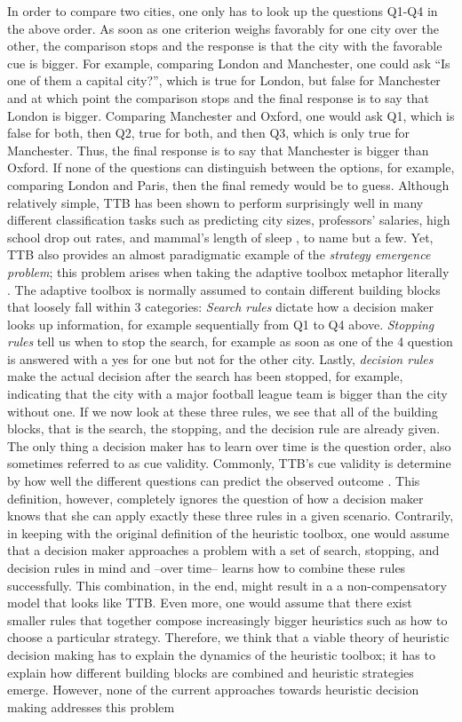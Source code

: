 \documentclass[a4paper,man, natbib]{apa6}
\begin{document}
In order to compare two cities, one only has to look up the questions Q1-Q4 in the above order. As soon as one criterion weighs favorably for one city over the other, the comparison stops and the response is that the city with the favorable cue is bigger. For example, comparing London and Manchester, one could ask ``Is one of them a capital city?'', which is true for London, but false for Manchester and at which point the comparison stops and the final response is to say that London is bigger. Comparing Manchester and Oxford, one would ask Q1, which is false for both, then Q2, true for both, and then Q3, which is only true for Manchester. Thus, the final response is to say that Manchester is bigger than Oxford. If none of the questions can distinguish between the options, for example, comparing London and Paris, then the final remedy would be to guess. Although relatively simple, TTB has been shown to perform surprisingly well in many different classification tasks such as predicting city sizes, professors' salaries, high school drop out rates, and mammal's length of sleep \citep{gigerenzer1999simple}, to name but a few. Yet, TTB also provides an almost paradigmatic example of the \emph{strategy emergence problem}; this problem arises when taking the adaptive toolbox metaphor literally \citep{gigerenzer2011heuristic}. The adaptive toolbox is normally assumed to contain different building blocks that loosely fall within 3 categories: \emph{Search rules} dictate how a decision maker looks up information, for example sequentially from Q1 to Q4 above. \emph{Stopping rules} tell us when to stop the search, for example as soon as one of the 4 question is answered with a yes for one but not for the other city. Lastly, \emph{decision rules} make the actual decision after the search has been stopped, for example, indicating that the city with a major football league team is bigger than the city without one. If we now look at these three rules, we see that all of the building blocks, that is the search, the stopping, and the decision rule are already given. The only thing a decision maker has to learn over time is the question order, also sometimes referred to as cue validity. Commonly, TTB's cue validity is determine by how well the different questions can predict the observed outcome \citep{broder2000assessing}. This definition, however, completely ignores the question of how a decision maker knows that she can apply exactly these three rules in a given scenario. Contrarily, in keeping with the original definition of the heuristic toolbox, one would assume that a decision maker approaches a problem with a set of search, stopping, and decision rules in mind and --over time-- learns how to combine these rules successfully. This combination, in the end, might result in a a non-compensatory model that looks like TTB. Even more, one would assume that there exist smaller rules that together compose increasingly bigger heuristics such as how to choose a particular strategy. Therefore, we think that a viable theory of heuristic decision making has to explain the dynamics of the heuristic toolbox; it has to explain how different building blocks are combined and heuristic strategies emerge. However, none of the current approaches towards heuristic decision making addresses this problem 
\end{document}
